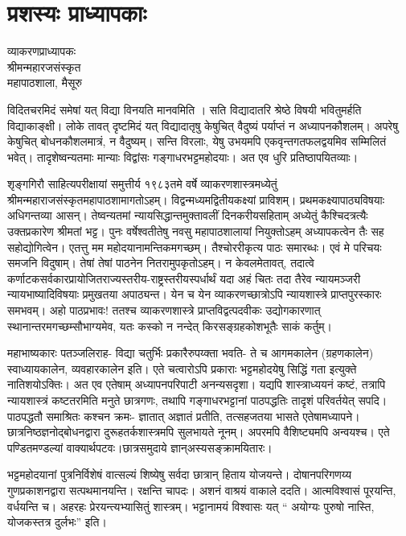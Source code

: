 \chapter{प्रशस्यः प्राध्यापकाः}

\begin{center}
\smallskip
व्याकरणप्राध्यापकः\\
श्रीमन्महारजसंस्कृत\\
महापाठशाला, मैसूरु
\addrule
\end{center}
विदितचरमिदं समेषां यत् विद्या विनयति मानवमिति । सति विद्यादातरि श्रेष्ठे विषयी भवितुमर्हति विद्याकाङ्क्षी।  लोके तावत् दृष्टमिदं यत् विद्यादातृषु केषुचित् वैदुष्यं पर्याप्तं न अध्यापनकौशलम्। अपरेषु केषुचित् बोधनकौशलमात्रं, न वैदुष्यम्। सन्ति विरलाः, येषु उभयमपि एकवृन्तगतफलद्वयमिव सम्मिलितं भवेत्। तादृशेष्वन्यतमाः मान्याः विद्वांसः गङ्गाधरभट्टमहोदयाः। अत एव धुरि प्रतिष्ठापयितव्याः।

शृङ्गगिरौ साहित्यपरीक्षायां समुत्तीर्य १९८३तमे वर्षे व्याकरणशास्त्रमध्येतुं श्रीमन्महाराजसंस्कृतमहापाठशामागतोऽहम्। विद्वन्मध्यमद्वितीयकक्ष्यां प्राविशम्। प्रथमकक्ष्यापाठ्यविषयाः अधिगन्तव्या आसन्। तेष्वन्यतमां न्यायसिद्धान्तमुक्तावलीं दिनकरीयसहिताम् अध्येतुं कैश्चिदत्रत्यैः उक्तप्रकारेण श्रीमतां भट्ट। पुनः वर्षेश्वतीतेषु नवसु महापाठशालायां नियुक्तोऽहम् अध्यापकत्वेन तैः सह सहोद्योगित्वेन। एतत्तु मम महोदयानामन्तिकमगच्छम्। तैश्चोररीकृत्य पाठः समारब्धः। एवं मे परिचयः समजनि विदुषाम्। तेषां तेषां पाठनेन नितरामुपकृतोऽहम्। न केवलमेतावत्, तदात्वे कर्णाटकसर्वकारप्रायोजितराज्यस्तरीय-राष्ट्रस्तरीयस्पर्धार्थं यदा अहं चितः तदा तैरेव न्यायमञ्जरी न्यायभाष्यादिविषयाः प्रमुखतया अपाठ्यन्त। येन च येन व्याकरणच्छात्रोऽपि न्यायशास्त्रे प्राप्तपुरस्कारः समभवम्। अहो पाठप्रभावः! ततश्च व्याकरणशास्त्रे प्राप्तविद्वत्पदवीकः उद्योगकारणात् स्थानान्तरमगच्छम्सौभाग्यमेव, यतः कस्को न नन्देत् किरसङ्ग्रहकोशभूतैः साकं कर्तुम्।

महाभाष्यकारः पतञ्जलिराह- विद्या चतुर्भिः प्रकारैरुपय्क्ता भवति- ते च आगमकालेन (ग्रहणकालेन) स्वाध्यायकालेन, व्यवहारकालेन इति। एते चत्वारोऽपि प्रकाराः भट्टमहोदयेषु सिद्धिं गता इत्युक्ते नातिशयोऽक्तिः। अत एव एतेषाम् अध्यापनपरिपाटी अनन्यसदृशा। यद्यपि शास्त्राध्ययनं कष्टं, तत्रापि न्यायशास्त्रं कष्टतरमिति मनुते छात्रगणः, तथापि गङ्गाधरभट्टानां पाठपद्धतिः तादृशं परिवर्तयेत् सपदि। पाठपद्धतौ समाश्रितः कश्चन क्रमः- ज्ञातात् अज्ञातं प्रतीति, तत्सहजतया भासते एतेषामध्यापने। छात्रनिष्ठज्ञनोद्बोधनद्वारा दुरूहतर्कशास्त्रमपि सुलभायते नूनम्। अपरमपि वैशिष्ट्यमपि अन्वयश्च। एते पण्डितमण्डल्यां वाक्यार्थपटवः।छात्रसमुदाये ज्ञान्अस्यसङ्क्रामयितारः। 

भट्टमहोदयानां पुत्रनिर्विशेषं वात्सल्यं शिष्येषु सर्वदा छात्रान् हिताय योजयन्ते। दोषानपरिगणय्य गुणप्रकाशनद्वारा सत्पथमानयन्ति। रक्षन्ति चापदः। अशनं वाश्रयं वाकाले ददति। आत्मविश्वासं पूरयन्ति, वर्धयन्ति च। अहरहः प्रेरयन्त्यभ्यासितुं शास्त्रम्। भट्टानामयं विश्वासः यत् “ अयोग्यः पुरुषो नास्ति, योजकस्तत्र दुर्लभः” इति। 

